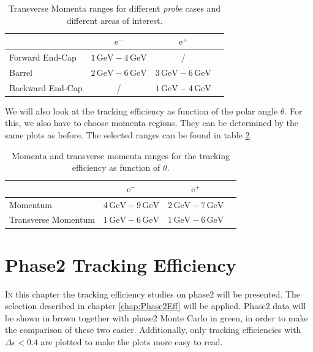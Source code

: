 \documentclass[a4paper,11pt,twosided,final,german,openbib,pdftex,listof=totoc,bibliography=totoc]{scrbook}
\begin{document}
\begin{table}[h!]
	\centering
	\begin{tabular}{lccc}
		&$\textrm{e}^-$ &$\textrm{e}^+$\\
		\hline
		Forward End-Cap &$1\,\textrm{GeV} - 4\,\textrm{GeV}$&/\\
		Barrel &$2\,\textrm{GeV} - 6\,\textrm{GeV}$&$3\,\textrm{GeV} - 6\,\textrm{GeV}$\\
		Backward End-Cap & /&$1\,\textrm{GeV} - 4\,\textrm{GeV}$\\
	\end{tabular}
	
	\caption[Areas Of Interest Different Transverse Momenta Ranges For Tracking Efficiency As Function Of $\phi$]{Transverse Momenta ranges for different \textit{probe} cases and different areas of interest.}
	\label{tab:RTPtMDTable}
\end{table}

We will also look at the tracking efficiency as function of the polar angle $\theta$. For this, we also have to choose momenta regions. They can be determined by the same plots as before.
The selected ranges can be found in table \ref{tab:RTPMDThetaTable}.

\begin{table}[h!]
	\centering
	\begin{tabular}{lccc}
		&$\textrm{e}^-$ &$\textrm{e}^+$\\
		\hline
		Momentum &$4\,\textrm{GeV} - 9\,\textrm{GeV}$&$2\,\textrm{GeV} - 7\,\textrm{GeV}$\\
		Transverse Momentum &$1\,\textrm{GeV} - 6\,\textrm{GeV}$&$1\,\textrm{GeV} - 6\,\textrm{GeV}$\\

	\end{tabular}
	
	\caption[Different (Transverse-) Momenta Ranges For Tracking Efficiency As Function Of $\theta$]{Momenta and transverse momenta ranges for the tracking efficiency as function of $\theta$.}
	\label{tab:RTPMDThetaTable}
\end{table}

\chapter{Phase2 Tracking Efficiency}
\label{chp:TrackingEfficiencyPhase2}



\lettrine{I}{n} this chapter the tracking efficiency studies on phase2 will be presented. The selection described in chapter \ref{chap:Phase2Eff} will be applied. Phase2 data will be shown in brown together with phase2 Monte Carlo in green, in order to make the comparison of these two easier. Additionally, only tracking efficiencies with $\Delta \epsilon < 0.4$ are plotted to make the plots more easy to read. 
\newline
 
\end{document}
